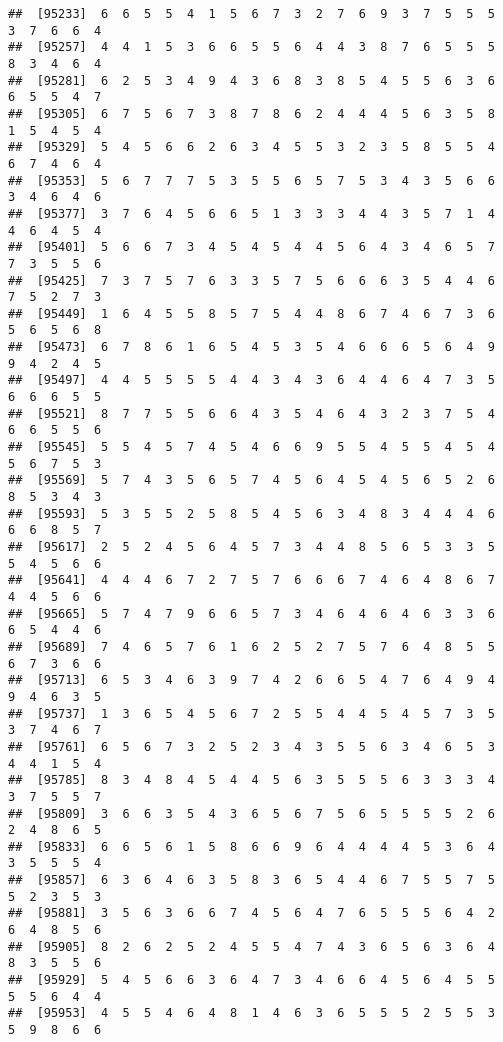 \documentclass[
]{book}
\begin{document}
\begin{verbatim}
##  [95233]  6  6  5  5  4  1  5  6  7  3  2  7  6  9  3  7  5  5  5  3  7  6  6  4
##  [95257]  4  4  1  5  3  6  6  5  5  6  4  4  3  8  7  6  5  5  5  8  3  4  6  4
##  [95281]  6  2  5  3  4  9  4  3  6  8  3  8  5  4  5  5  6  3  6  6  5  5  4  7
##  [95305]  6  7  5  6  7  3  8  7  8  6  2  4  4  4  5  6  3  5  8  1  5  4  5  4
##  [95329]  5  4  5  6  6  2  6  3  4  5  5  3  2  3  5  8  5  5  4  6  7  4  6  4
##  [95353]  5  6  7  7  7  5  3  5  5  6  5  7  5  3  4  3  5  6  6  3  4  6  4  6
##  [95377]  3  7  6  4  5  6  6  5  1  3  3  3  4  4  3  5  7  1  4  4  6  4  5  4
##  [95401]  5  6  6  7  3  4  5  4  5  4  4  5  6  4  3  4  6  5  7  7  3  5  5  6
##  [95425]  7  3  7  5  7  6  3  3  5  7  5  6  6  6  3  5  4  4  6  7  5  2  7  3
##  [95449]  1  6  4  5  5  8  5  7  5  4  4  8  6  7  4  6  7  3  6  5  6  5  6  8
##  [95473]  6  7  8  6  1  6  5  4  5  3  5  4  6  6  6  5  6  4  9  9  4  2  4  5
##  [95497]  4  4  5  5  5  5  4  4  3  4  3  6  4  4  6  4  7  3  5  6  6  6  5  5
##  [95521]  8  7  7  5  5  6  6  4  3  5  4  6  4  3  2  3  7  5  4  6  6  5  5  6
##  [95545]  5  5  4  5  7  4  5  4  6  6  9  5  5  4  5  5  4  5  4  5  6  7  5  3
##  [95569]  5  7  4  3  5  6  5  7  4  5  6  4  5  4  5  6  5  2  6  8  5  3  4  3
##  [95593]  5  3  5  5  2  5  8  5  4  5  6  3  4  8  3  4  4  4  6  6  6  8  5  7
##  [95617]  2  5  2  4  5  6  4  5  7  3  4  4  8  5  6  5  3  3  5  5  4  5  6  6
##  [95641]  4  4  4  6  7  2  7  5  7  6  6  6  7  4  6  4  8  6  7  4  4  5  6  6
##  [95665]  5  7  4  7  9  6  6  5  7  3  4  6  4  6  4  6  3  3  6  6  5  4  4  6
##  [95689]  7  4  6  5  7  6  1  6  2  5  2  7  5  7  6  4  8  5  5  6  7  3  6  6
##  [95713]  6  5  3  4  6  3  9  7  4  2  6  6  5  4  7  6  4  9  4  9  4  6  3  5
##  [95737]  1  3  6  5  4  5  6  7  2  5  5  4  4  5  4  5  7  3  5  3  7  4  6  7
##  [95761]  6  5  6  7  3  2  5  2  3  4  3  5  5  6  3  4  6  5  3  4  4  1  5  4
##  [95785]  8  3  4  8  4  5  4  4  5  6  3  5  5  5  6  3  3  3  4  3  7  5  5  7
##  [95809]  3  6  6  3  5  4  3  6  5  6  7  5  6  5  5  5  5  2  6  2  4  8  6  5
##  [95833]  6  6  5  6  1  5  8  6  6  9  6  4  4  4  4  5  3  6  4  3  5  5  5  4
##  [95857]  6  3  6  4  6  3  5  8  3  6  5  4  4  6  7  5  5  7  5  5  2  3  5  3
##  [95881]  3  5  6  3  6  6  7  4  5  6  4  7  6  5  5  5  6  4  2  6  4  8  5  6
##  [95905]  8  2  6  2  5  2  4  5  5  4  7  4  3  6  5  6  3  6  4  8  3  5  5  6
##  [95929]  5  4  5  6  6  3  6  4  7  3  4  6  6  4  5  6  4  5  5  5  5  6  4  4
##  [95953]  4  5  5  4  6  4  8  1  4  6  3  6  5  5  5  2  5  5  3  5  9  8  6  6

\end{verbatim}
\end{document}
